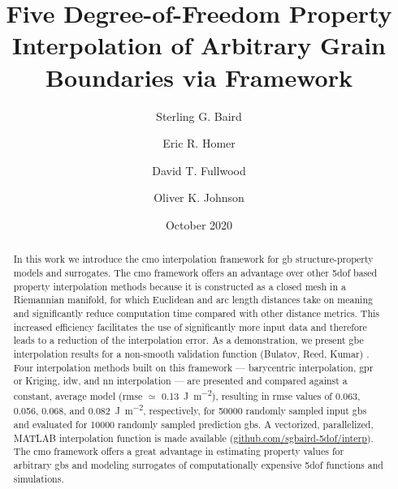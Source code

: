 \documentclass[preprint,12pt]{elsarticle}
\title{Five Degree-of-Freedom Property Interpolation of Arbitrary Grain Boundaries via \glsentrytitlecase{cmo}{long} Framework}
\author[myu]{Sterling G. Baird}
\author[myu]{Eric R. Homer}
\author[myu]{David T. Fullwood}
\author[myu]{Oliver K. Johnson}\corref{cor1}
\date{October 2020}
\begin{document}
\begin{abstract}
    In this work we introduce the \gls{cmo} interpolation framework for \gls{gb} structure-property models and surrogates. The \gls{cmo} framework offers an advantage over other \gls{5dof} based property interpolation methods because it is constructed as a closed mesh in a Riemannian manifold, for which Euclidean and arc length distances take on meaning and significantly reduce computation time compared with other distance metrics. This increased efficiency facilitates the use of significantly more input data and therefore leads to a reduction of the interpolation error. As a demonstration, we present \gls{gbe} interpolation results for a non-smooth validation function (Bulatov, Reed, Kumar) \cite{bulatovGrainBoundaryEnergy2014}.
    Four interpolation methods built on this framework --- barycentric interpolation, \gls{gpr} or Kriging, \gls{idw}, and \gls{nn} interpolation --- are presented and compared against a constant, average model (\gls{rmse} $\simeq$ \SI{0.13}{\J\per\square\meter}), resulting in \gls{rmse} values of 0.063, 0.056, 0.068, and \SI{0.082}{\J\per\square\meter}, respectively, for \num{50000} randomly sampled input \glspl{gb} and evaluated for \num{10000} randomly sampled prediction \glspl{gb}. A vectorized, parallelized, MATLAB interpolation function is made available (\url{github.com/sgbaird-5dof/interp}). The \gls{cmo} framework offers a great advantage in estimating property values for arbitrary \glspl{gb} and modeling surrogates of computationally expensive \gls{5dof} functions and simulations.
\end{abstract}
\end{document}
